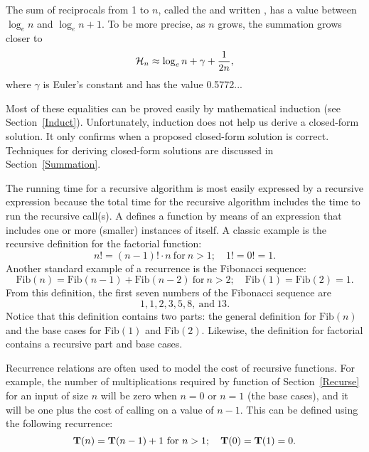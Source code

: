 The sum of reciprocals from 1 to \(n\), called the
and written \Harmonic, has a value between
\(\log_e n\) and \(\log_e n + 1\).
To be more precise, as \(n\) grows,
the summation grows closer to
\begin{equation}
\mbox{${\cal H}_n$} \approx \log_e n + \gamma + \frac{1}{2n},\label{HarmonicEq}
\end{equation}
where \(\gamma\) is Euler's constant and has the value 0.5772...

Most of these equalities can be proved easily by mathematical
induction (see Section~\ref{Induct}).
Unfortunately, induction does not help us derive a closed-form
solution.
It only confirms when a proposed closed-form solution is correct.
Techniques for deriving closed-form solutions are discussed
in Section~\ref{Summation}.

The running time for a recursive algorithm is most easily expressed by
a recursive expression because the total time for the recursive
algorithm includes the time to run the recursive
call(s).
A  defines a function by means of an
expression that includes one or more (smaller) instances of itself.
A classic example is the recursive definition for the
factorial function:
\[n! = (n-1)! \cdot n\ \mbox{for}\ n>1; \quad 1! = 0! = 1.\]
Another standard example of a recurrence is the Fibonacci
sequence:
\[\mbox{Fib}(n) = \mbox{Fib}(n-1) + \mbox{Fib}(n-2)\ \mbox{for}\ n>2;
\quad\mbox{Fib}(1) = \mbox{Fib}(2) = 1.\]
From this definition, the first seven numbers of the
Fibonacci sequence are \[1, 1, 2, 3, 5, 8,\ \mbox{and}\ 13.\]
Notice that this definition contains two parts: the general
definition for \(\mbox{Fib}(n)\) and the base cases for \(\mbox{Fib}(1)\)
and \(\mbox{Fib}(2)\). 
Likewise, the definition for factorial contains a recursive part and
base cases.

Recurrence relations are often used to model the cost of recursive
functions.
For example, the number of multiplications required by function
 of Section~\ref{Recurse} for an input of size \(n\) will
be zero when \(n = 0\) or \(n = 1\) (the base cases), and it will be
one plus the cost of calling  on a value of \(n-1\).
This can be defined using the following recurrence:
\[\mbox{$\textbf{T}(n)$} = \mbox{$\textbf{T}(n-1)$} + 1\ \mbox{for}\ n>1;
\quad {\textbf{T}}(0) = {\textbf{T}}(1) = 0.\]

